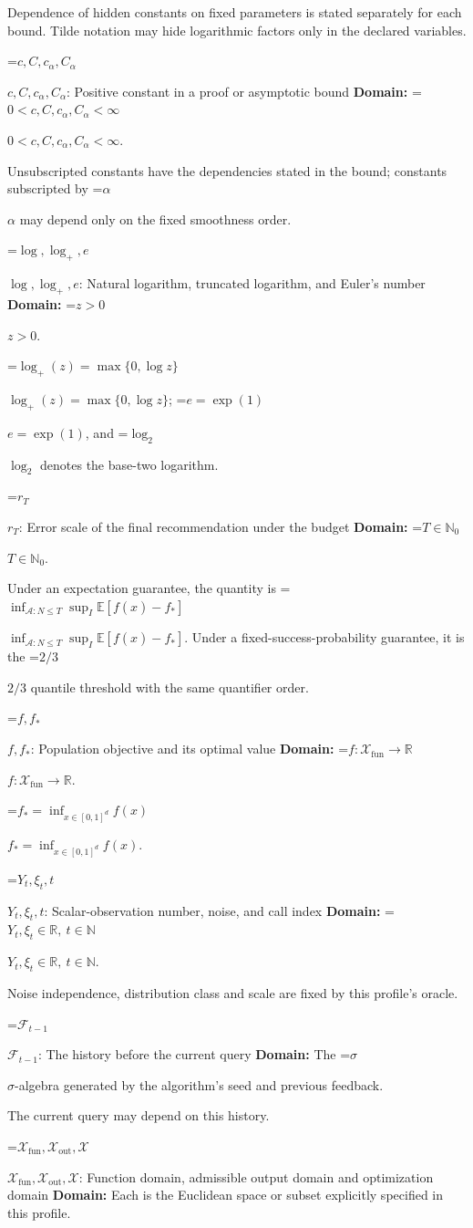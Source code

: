 \documentclass[10pt,a4paper]{article}
\newcommand{\AtlasMath}[1]{\par\begingroup\centering\setbox0=\hbox{$\displaystyle #1$}\ifdim\wd0>1.4\linewidth\typeout{ATLAS WIDE FORMULA: \the\wd0}\fi\ifdim\wd0>\linewidth\resizebox{\linewidth}{!}{\box0}\else\box0\fi\par\endgroup}
\newcommand{\AtlasInlineMath}[1]{\begingroup\setbox0=\hbox{$#1$}\ifdim\wd0>.4\linewidth\endgroup\AtlasMath{#1}\else\endgroup$#1$\fi}
\begin{document}
Dependence of hidden constants on fixed parameters is stated separately for each bound. Tilde notation may hide logarithmic factors only in the declared variables.

\AtlasInlineMath{c,C,c_\alpha,C_\alpha}: Positive constant in a proof or asymptotic bound \textbf{Domain:} \AtlasInlineMath{0<c,C,c_\alpha,C_\alpha<\infty}.

Unsubscripted constants have the dependencies stated in the bound; constants subscripted by \AtlasInlineMath{\alpha} may depend only on the fixed smoothness order.

\AtlasInlineMath{\log,\log_+,e}: Natural logarithm, truncated logarithm, and Euler's number \textbf{Domain:} \AtlasInlineMath{z>0}.

\AtlasInlineMath{\log_+(z)=\max\{0,\log z\}}; \AtlasInlineMath{e=\exp(1)}, and \AtlasInlineMath{\log_2} denotes the base-two logarithm.

\AtlasInlineMath{r_T}: Error scale of the final recommendation under the budget \textbf{Domain:} \AtlasInlineMath{T\in\mathbb{N}_0}.

Under an expectation guarantee, the quantity is \AtlasInlineMath{\inf_{\mathcal{A}:N\le T}\sup_I\mathbb{E}[f(\widehat{x})-f_*]}. Under a fixed-success-probability guarantee, it is the \AtlasInlineMath{2/3} quantile threshold with the same quantifier order.

\AtlasInlineMath{f,f_*}: Population objective and its optimal value \textbf{Domain:} \AtlasInlineMath{f:\mathcal{X}_{\mathrm{fun}}\to\mathbb{R}}.

\AtlasInlineMath{f_*=\inf_{x\in [0,1]^d}f(x)}.

\AtlasInlineMath{Y_t,\xi_t,t}: Scalar-observation number, noise, and call index \textbf{Domain:} \AtlasInlineMath{Y_t,\xi_t\in\mathbb{R},\ t\in\mathbb{N}}.

Noise independence, distribution class and scale are fixed by this profile's oracle.

\AtlasInlineMath{\mathcal{F}_{t-1}}: The history before the current query \textbf{Domain:} The \AtlasInlineMath{\sigma}-algebra generated by the algorithm's seed and previous feedback.

The current query may depend on this history.

\AtlasInlineMath{\mathcal{X}_{\mathrm{fun}},\mathcal{X}_{\mathrm{out}},\mathcal{X}}: Function domain, admissible output domain and optimization domain \textbf{Domain:} Each is the Euclidean space or subset explicitly specified in this profile.
\end{document}
